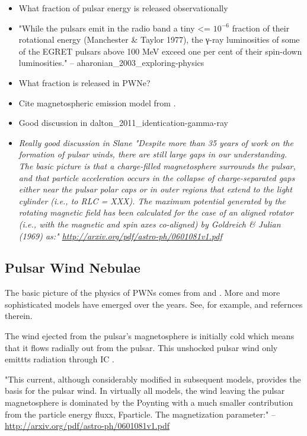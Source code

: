 \begin{itemize}
  \item What fraction of pulsar energy is released observationally
\item "While the pulsars emit in the radio band a tiny <= $10^{-6}$
fraction of their rotational energy (Manchester \& Taylor 1977), the
γ-ray luminosities of some of the EGRET pulsars above 100 MeV exceed
one per cent of their spin-down luminosities." -- aharonian\_2003\_exploring-physics
  \item What fraction is released in PWNe?
\item Cite magnetospheric emission model from \cite{gold_1968_rotating-neutron}.
  \item Good discussion in dalton\_2011\_identication-gamma-ray
\item \em{Really good discussion in Slane}
"Despite more than 35 years of work on the formation of pulsar winds, there are
still large gaps in our understanding. The basic picture is that a charge-ﬁlled
magnetosphere surrounds the pulsar, and that particle acceleration occurs in the
collapse of charge-separated gaps either near the pulsar polar caps or in outer
regions that extend to the light cylinder (i.e., to RLC = XXX). The maximum
potential generated by the rotating magnetic field has been calculated for the
case of an aligned rotator (i.e., with the magnetic and spin axes co-aligned) by
Goldreich \& Julian (1969) as:" \url{http://arxiv.org/pdf/astro-ph/0601081v1.pdf}
\end{itemize}

\subsection{Pulsar Wind Nebulae}

The basic picture of the physics of \acp{PWN}
comes from \cite{rees_1974_origin-magnetic} and
\cite{kennel_1984_magnetohydrodynamic-model}.  More and more
sophisticated models have emerged over the years.  See, for example,
\cite{gelfand_2009_dynamical-model} and refernces therein.

The wind ejected from the pulsar's magnetosphere is initially cold
which means that it flows radially out from the pulsar.
This unshocked pulsar wind only emittts radiation through \ac{IC}
\cite{bogovalov_2000_very-high-energy-gamma}.

"This current, although considerably modified in subsequent models,
provides the basis for the pulsar wind. In virtually all models, the
wind leaving the pulsar magnetosphere is dominated by the Poynting with a
much smaller contribution from the particle energy fluxx, Fparticle. The
magnetization parameter:" -- \url{http://arxiv.org/pdf/astro-ph/0601081v1.pdf}

